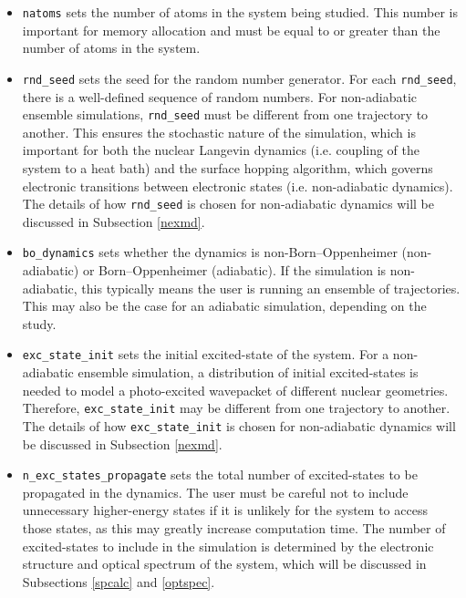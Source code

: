 \documentclass[letterpaper,12pt,titlepage]{article}
\begin{document}
\begin{itemize}
\item \verb+natoms+ sets the number of atoms in the system being studied.  This number is important for memory allocation and must be equal to or greater than the number of atoms in the system.
\item \verb+rnd_seed+ sets the seed for the random number generator.  For each \verb+rnd_seed+, there is a well-defined sequence of random numbers.  For non-adiabatic ensemble simulations, \verb+rnd_seed+ must be different from one trajectory to another.  This ensures the stochastic nature of the simulation, which is important for both the nuclear Langevin dynamics (i.e. coupling of the system to a heat bath) and the surface hopping algorithm,\cite{tully1990molecular} which governs electronic transitions between electronic states (i.e. non-adiabatic dynamics).  The details of how \verb+rnd_seed+ is chosen for non-adiabatic dynamics will be discussed in Subsection \ref{nexmd}. 
\item \verb+bo_dynamics+ sets whether the dynamics is non-Born--Oppenheimer (non-adiabatic) or Born--Oppenheimer (adiabatic).  If the simulation is non-adiabatic, this typically means the user is running an ensemble of trajectories.  This may also be the case for an adiabatic simulation, depending on the study.
\item \verb+exc_state_init+ sets the initial excited-state of the system.  For a non-adiabatic ensemble simulation, a distribution of initial excited-states is needed to model a photo-excited wavepacket of different nuclear geometries.  Therefore, \verb+exc_state_init+ may be different from one trajectory to another.  The details of how \verb+exc_state_init+ is chosen for non-adiabatic dynamics will be discussed in Subsection \ref{nexmd}. 
\item \verb+n_exc_states_propagate+ sets the total number of excited-states to be propagated in the dynamics.  The user must be careful not to include unnecessary higher-energy states if it is unlikely for the system to access those states, as this may greatly increase computation time.  The number of excited-states to include in the simulation is determined by the electronic structure and optical spectrum of the system, which will be discussed in Subsections \ref{spcalc} and \ref{optspec}.
\end{itemize}
\end{document}
